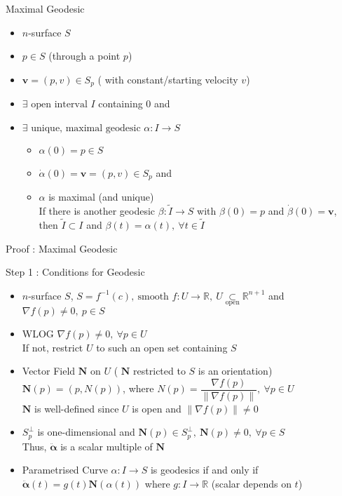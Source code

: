 \documentclass{beamer}
\begin{document}
\begin{frame}{Maximal Geodesic}
\begin{theorem}
\begin{itemize}
	\item $n$-surface $S$
	\item $p \in S$ (through a point $p$)
	\item $\mathbf{v} = (p,v) \in S_p$ ( with constant/starting velocity $v$)
	\item $\exists \text{ open interval } I$ containing $0$ and
	\item $\exists \text{ unique, maximal geodesic } \alpha : I \to S$
	\begin{itemize}
		\item $\alpha(0) = p \in S$
		\item $\dot{\alpha}(0) = \mathbf{v} = (p,v) \in S_p$ and
		\item $\alpha$ is maximal (and unique)\\
			If there is another geodesic $\beta : \tilde{I} \to S$ with $\beta(0) = p$ and $\dot{\beta}(0) = \mathbf{v}$, then $\tilde{I} \subset I$ and $\beta(t) = \alpha(t),\ \forall t \in \tilde{I}$
	\end{itemize}
\end{itemize}
\end{theorem}
\end{frame}

\begin{frame}{Proof : Maximal Geodesic}
\begin{block}{Step 1 : Conditions for Geodesic}
\begin{itemize}
	\item $n$-surface $S$, $S = f^{-1}(c),\ \text{smooth }f : U \to \mathbb{R},\ U \underset{\text{open}}{\subset} \mathbb{R}^{n+1}$
		and $\nabla f(p) \ne 0,\ p \in S$
	\item WLOG $\nabla f(p) \ne 0,\ \forall p \in U$\\
		If not, restrict $U$ to such an open set containing $S$
	\item Vector Field $\mathbf{N}$ on $U$ ( $\mathbf{N}$ restricted to $S$ is an orientation)\\
		$\mathbf{N}(p) = (p,N(p))$, where $N(p) = \dfrac{\nabla f(p)}{\|\nabla f(p)\|},\ \forall p \in U$ \\
		$\mathbf{N}$ is well-defined since $U$ is open and $\| \nabla f(p) \| \ne 0$
	\item $S_p^\perp$ is one-dimensional and $\mathbf{N}(p) \in S_p^\perp,\ \mathbf{N}(p) \ne 0,\ \forall p \in S$\\
		Thus, $\ddot{\boldsymbol{\alpha}}$ is a scalar multiple of $\mathbf{N}$

	\item Parametrised Curve $\alpha : I \to S$ is geodesics if and only if
		$\ddot{\boldsymbol{\alpha}}(t) = g(t)\mathbf{N}(\alpha(t))$ where $g : I \to \mathbb{R}$ (scalar depends on $t$)
\end{itemize}
\end{block}
\end{frame}
\end{document}
